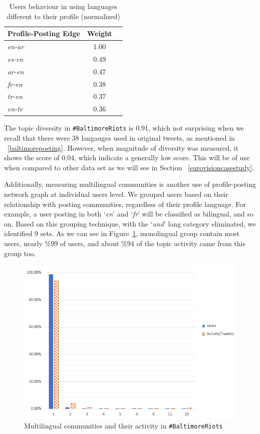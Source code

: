 \begin{table}[!htb]
\centering
\begin{tabular}{@{}lcr@{}}
\toprule
\textbf{Profile-Posting Edge} & \textbf{Weight} \\ \midrule
{\emph{en-ar}} & 1.00 \\
{\emph{es-en}} & 0.49 \\
{\emph{ar-en}} & 0.47\\ 
{\emph{fr-en}} & 0.38 \\
{\emph{tr-en}} & 0.37 \\
{\emph{en-tr}} & 0.36 \\ \bottomrule
\end{tabular}
\caption{Users behaviour in using languages different to their profile (normalized)}
\label{tbl:baltimoredifflang}
\end{table}


The topic diversity in  {\texttt{\#BaltimoreRiots}} is 0.91, which not surprising 
when we recall that there were 38 langauges used in original tweets, as mentioned in 
~\ref{baltimoreposting}. However, when magnitude of diversity was measured, 
it shows the score of 0.04, which indicate a generally low score. This will be of use
when compared to other data set as we will see in Section ~\ref{eurovisioncasestudy}.

Additionally, measuring multilingual communities is another use of profile-posting network 
graph at individual users level. We grouped users based on their relationship with
posting communities, regardless of their profile language. For
example, a user posting in both `{\emph{en}}' and `{\emph{fr}}' will
be classified as bilingual, and so on. Based on this grouping
technique, with the `{\emph{und}}' lang category eliminated, we
identified 9 sets. As we can see in Figure~\ref{fig:baltimore_multilingual}, 
monolingual group contain most users, nearly \%99 of users, and about 
\%94 of the topic activity came from this group too.


\begin{figure}
\centering
\includegraphics[width=\columnwidth]{images/baltimore_multilingual.png}
\caption{Multilingual communities and their activity in {\texttt{\#BaltimoreRiots}}}
\label{fig:baltimore_multilingual}
\end{figure}


